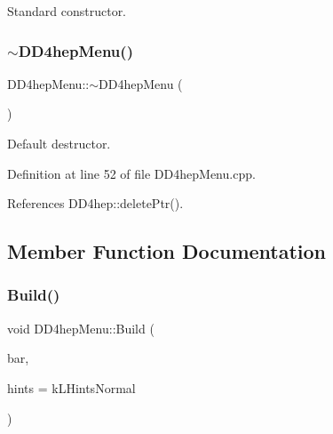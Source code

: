 Standard constructor. 

\hypertarget{class_d_d4hep_1_1_d_d4hep_menu_ab6c197b60017a053af2d1d41e63574f2}{}\label{class_d_d4hep_1_1_d_d4hep_menu_ab6c197b60017a053af2d1d41e63574f2} 
\subsubsection{\texorpdfstring{$\sim$\+D\+D4hep\+Menu()}{~DD4hepMenu()}}
{\footnotesize\ttfamily D\+D4hep\+Menu\+::$\sim$\+D\+D4hep\+Menu (\begin{DoxyParamCaption}{ }\end{DoxyParamCaption})\hspace{0.3cm}{\ttfamily [virtual]}}



Default destructor. 



Definition at line 52 of file D\+D4hep\+Menu.\+cpp.



References D\+D4hep\+::delete\+Ptr().



\subsection{Member Function Documentation}
\hypertarget{class_d_d4hep_1_1_d_d4hep_menu_a85d08c3fd89b740586c592797e780607}{}\label{class_d_d4hep_1_1_d_d4hep_menu_a85d08c3fd89b740586c592797e780607} 
\subsubsection{\texorpdfstring{Build()}{Build()}}
{\footnotesize\ttfamily void D\+D4hep\+Menu\+::\+Build (\begin{DoxyParamCaption}\item[{T\+G\+Menu\+Bar $\ast$}]{bar,  }\item[{int}]{hints = {\ttfamily kLHintsNormal} }\end{DoxyParamCaption})\hspace{0.3cm}{\ttfamily [virtual]}}



